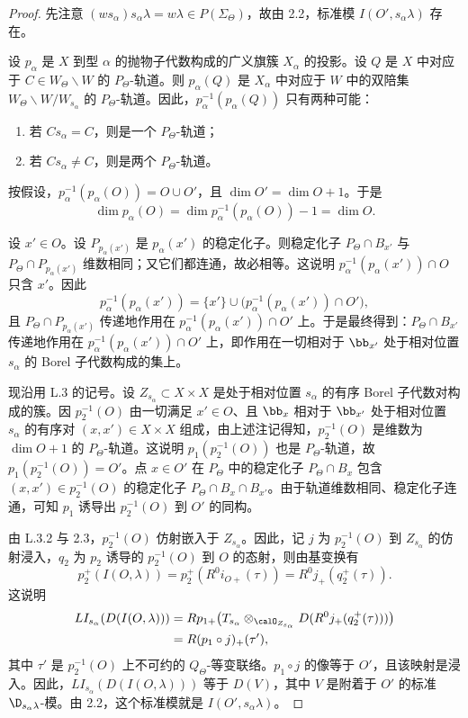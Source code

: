 \begin{proof}
先注意 $(ws_\alpha)s_\alpha\lambda=w\lambda\in P(\Sigma_\Theta)$，故由 2.2，标准模 $I(O',s_\alpha\lambda)$ 存在。

设 $p_\alpha$ 是 $X$ 到型 $\alpha$ 的抛物子代数构成的广义旗簇 $X_\alpha$ 的投影。设 $Q$ 是 $X$ 中对应于 $C\in W_\Theta\backslash W$ 的 $P_\Theta$-轨道。则 $p_\alpha(Q)$ 是 $X_\alpha$ 中对应于 $W$ 中的双陪集 $W_\Theta\backslash W/W_{s_\alpha}$ 的 $P_\Theta$-轨道。因此，$p_\alpha^{-1}(p_\alpha(Q))$ 只有两种可能：
\begin{enumerate}[label=(\alph*)]
\item 若 $Cs_\alpha=C$，则是一个 $P_\Theta$-轨道；
\item 若 $Cs_\alpha\neq C$，则是两个 $P_\Theta$-轨道。
\end{enumerate}
按假设，$p_\alpha^{-1}(p_\alpha(O))=O\cup O'$，且 $\dim O'=\dim O+1$。于是
$$\dim p_\alpha(O)=\dim p_\alpha^{-1}(p_\alpha(O))-1=\dim O.$$

设 $x'\in O$。设 $P_{p_\alpha(x')}$ 是 $p_\alpha(x')$ 的稳定化子。则稳定化子 $P_\Theta\cap B_{x'}$ 与 $P_\Theta\cap P_{p_\alpha(x')}$ 维数相同；又它们都连通，故必相等。这说明 $p_\alpha^{-1}(p_\alpha(x'))\cap O$ 只含 $x'$。因此
$$p_\alpha^{-1}(p_\alpha(x'))=\{x'\}\cup\bigl(p_\alpha^{-1}(p_\alpha(x'))\cap O'\bigr),$$
且 $P_\Theta\cap P_{p_\alpha(x')}$ 传递地作用在 $p_\alpha^{-1}(p_\alpha(x'))\cap O'$ 上。于是最终得到：$P_\Theta\cap B_{x'}$ 传递地作用在 $p_\alpha^{-1}(p_\alpha(x'))\cap O'$ 上，即作用在一切相对于 $\bb_{x'}$ 处于相对位置 $s_\alpha$ 的 Borel 子代数构成的集上。

现沿用 L.3 的记号。设 $Z_{s_\alpha}\subset X\times X$ 是处于相对位置 $s_\alpha$ 的有序 Borel 子代数对构成的簇。因 $p_2^{-1}(O)$ 由一切满足 $x'\in O$、且 $\bb_x$ 相对于 $\bb_{x'}$ 处于相对位置 $s_\alpha$ 的有序对 $(x,x')\in X\times X$ 组成，由上述注记得知，$p_2^{-1}(O)$ 是维数为 $\dim O+1$ 的 $P_\Theta$-轨道。这说明 $p_1(p_2^{-1}(O))$ 也是 $P_\Theta$-轨道，故 $p_1(p_2^{-1}(O))=O'$。点 $x\in O'$ 在 $P_\Theta$ 中的稳定化子 $P_\Theta\cap B_x$ 包含 $(x,x')\in p_2^{-1}(O)$ 的稳定化子 $P_\Theta\cap B_x\cap B_{x'}$。由于轨道维数相同、稳定化子连通，可知 $p_1$ 诱导出 $p_2^{-1}(O)$ 到 $O'$ 的同构。

由 L.3.2 与 2.3，$p_2^{-1}(O)$ 仿射嵌入于 $Z_{s_\alpha}$。因此，记 $j$ 为 $p_2^{-1}(O)$ 到 $Z_{s_\alpha}$ 的仿射浸入，$q_2$ 为 $p_2$ 诱导的 $p_2^{-1}(O)$ 到 $O$ 的态射，则由基变换有
$$p_2^+(I(O,\lambda))=p_2^+(R^0i_{O+}(\tau))=R^0j_+(q_2^+(\tau)).$$
这说明
\begin{align*}
LI_{s_\alpha}(D(I(O,\lambda)))&=Rp_{1+}\bigl(T_{s_\alpha}\otimes_{\calO_{Z_{s_\alpha}}}D(R^0j_+(q_2^+(\tau)))\bigr)\\
&=R(p_1\circ j)_+(\tau'),
\end{align*}
其中 $\tau'$ 是 $p_2^{-1}(O)$ 上不可约的 $Q_\Theta$-等变联络。$p_1\circ j$ 的像等于 $O'$，且该映射是浸入。因此，$LI_{s_\alpha}(D(I(O,\lambda)))$ 等于 $D(V)$，其中 $V$ 是附着于 $O'$ 的标准 $\D_{s_\alpha\lambda}$-模。由 2.2，这个标准模就是 $I(O',s_\alpha\lambda)$。
\end{proof}

